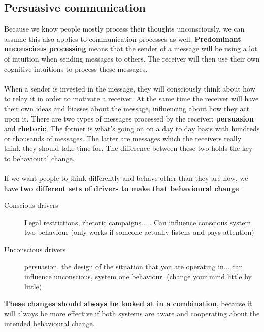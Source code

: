 \documentclass[../summary.tex]{subfiles}
\begin{document}
\subsection{Persuasive communication}
Because we know people mostly process their thoughts unconsciously, we can assume this also applies to communication processes as well. \textbf{Predominant unconscious processing} means that the sender of a message will be using a lot of intuition when sending messages to others. The receiver will then use their own cognitive intuitions to process these messages.
\\\\
When a sender is invested in the message, they will consciously think about how to relay it in order to motivate a receiver. At the same time the receiver will have their own ideas and biasses about the message, influencing about how they act upon it. There are two types of messages processed by the receiver: \textbf{persuasion} and \textbf{rhetoric}. The former is what's going on on a day to day basis with hundreds or thousands of messages. The latter are messages which the receivers really think they should take time for. The difference between these two holds the key to behavioural change.
\\\\
If we want people to think differently and behave other than they are now, we have \textbf{two different sets of drivers to make that behavioural change}.
\begin{description}
	\item[Conscious drivers] Legal restrictions, rhetoric campaigns... . Can influence conscious system two behaviour (only works if someone actually listens and pays attention)
	\item[Unconscious drivers] persuasion, the design of the situation that you are operating in... can influence unconscious, system one behaviour. (change your mind little by little)
\end{description}
\textbf{These changes should always be looked at in a combination}, because it will always be more effective if both systems are aware and cooperating about the intended behavioural change.
\end{document}
